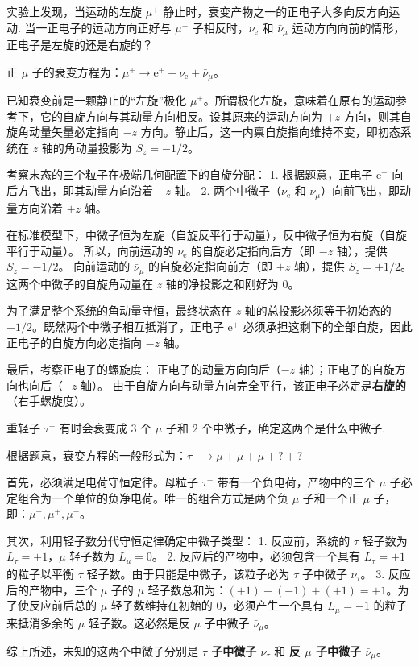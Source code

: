 \begin{exercise}\label{ex:30.9}
实验上发现，当运动的左旋 $\mu^+$ 静止时，衰变产物之一的正电子大多向反方向运动. 当一正电子的运动方向正好与 $\mu^+$ 子相反时，$\nu_{\mathrm{e}}$ 和 $\bar{\nu}_\mu$ 运动方向向前的情形，正电子是左旋的还是右旋的？
\end{exercise}
\begin{solution}
正 $\mu$ 子的衰变方程为：$\mu^+ \rightarrow \mathrm{e}^+ + \nu_{\mathrm{e}} + \bar{\nu}_\mu$。

已知衰变前是一颗静止的“左旋”极化 $\mu^+$。所谓极化左旋，意味着在原有的运动参考下，它的自旋方向与其动量方向相反。设其原来的运动方向为 $+z$ 方向，则其自旋角动量矢量必定指向 $-z$ 方向。静止后，这一内禀自旋指向维持不变，即初态系统在 $z$ 轴的角动量投影为 $S_z = -1/2$。

考察末态的三个粒子在极端几何配置下的自旋分配：
1. 根据题意，正电子 $\mathrm{e}^+$ 向后方飞出，即其动量方向沿着 $-z$ 轴。
2. 两个中微子（$\nu_{\mathrm{e}}$ 和 $\bar{\nu}_\mu$）向前飞出，即动量方向沿着 $+z$ 轴。

在标准模型下，中微子恒为左旋（自旋反平行于动量），反中微子恒为右旋（自旋平行于动量）。
所以，向前运动的 $\nu_{\mathrm{e}}$ 的自旋必定指向后方（即 $-z$ 轴），提供 $S_z = -1/2$。
向前运动的 $\bar{\nu}_\mu$ 的自旋必定指向前方（即 $+z$ 轴），提供 $S_z = +1/2$。
这两个中微子的自旋角动量在 $z$ 轴的净投影之和刚好为 $0$。

为了满足整个系统的角动量守恒，最终状态在 $z$ 轴的总投影必须等于初始态的 $-1/2$。既然两个中微子相互抵消了，正电子 $\mathrm{e}^+$ 必须承担这剩下的全部自旋，因此正电子的自旋方向必定指向 $-z$ 轴。

最后，考察正电子的螺旋度：
正电子的动量方向向后（$-z$ 轴）；正电子的自旋方向也向后（$-z$ 轴）。
由于自旋方向与动量方向完全平行，该正电子必定是\textbf{右旋的}（右手螺旋度）。
\end{solution}

\begin{exercise}\label{ex:30.10}
重轻子 $\tau^-$ 有时会衰变成 $3$ 个 $\mu$ 子和 $2$ 个中微子，确定这两个是什么中微子.
\end{exercise}
\begin{solution}
根据题意，衰变方程的一般形式为：$\tau^- \rightarrow \mu + \mu + \mu + ? + ?$

首先，必须满足电荷守恒定律。母粒子 $\tau^-$ 带有一个负电荷，产物中的三个 $\mu$ 子必定组合为一个单位的负净电荷。唯一的组合方式是两个负 $\mu$ 子和一个正 $\mu$ 子，即：$\mu^-, \mu^+, \mu^-$。

其次，利用轻子数分代守恒定律确定中微子类型：
1. 反应前，系统的 $\tau$ 轻子数为 $L_\tau = +1$，$\mu$ 轻子数为 $L_\mu = 0$。
2. 反应后的产物中，必须包含一个具有 $L_\tau = +1$ 的粒子以平衡 $\tau$ 轻子数。由于只能是中微子，该粒子必为 $\tau$ 子中微子 $\nu_\tau$。
3. 反应后的产物中，三个 $\mu$ 子的 $\mu$ 轻子数总和为：$(+1) + (-1) + (+1) = +1$。为了使反应前后总的 $\mu$ 轻子数维持在初始的 $0$，必须产生一个具有 $L_\mu = -1$ 的粒子来抵消多余的 $\mu$ 轻子数。这必然是反 $\mu$ 子中微子 $\bar{\nu}_\mu$。

综上所述，未知的这两个中微子分别是 \textbf{$\tau$ 子中微子 $\nu_\tau$} 和 \textbf{反 $\mu$ 子中微子 $\bar{\nu}_\mu$}。
\end{solution}


